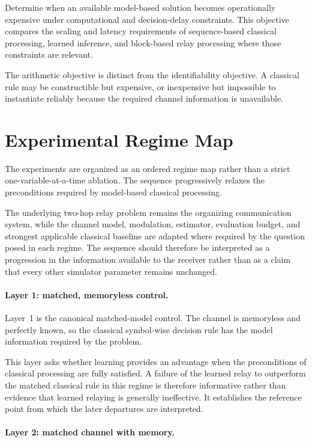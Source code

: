 Determine when an available model-based solution becomes operationally
expensive under computational and decision-delay constraints. This objective
compares the scaling and latency requirements of sequence-based classical
processing, learned inference, and block-based relay processing where those
constraints are relevant.

The arithmetic objective is distinct from the identifiability objective. A
classical rule may be constructible but expensive, or inexpensive but
impossible to instantiate reliably because the required channel information
is unavailable.


\section{Experimental Regime Map}
\label{sec:experimental-regime-map}

The experiments are organized as an ordered regime map rather than a strict
one-variable-at-a-time ablation. The sequence progressively relaxes the
preconditions required by model-based classical processing.

The underlying two-hop relay problem remains the organizing communication
system, while the channel model, modulation, estimator, evaluation budget, and
strongest applicable classical baseline are adapted where required by the
question posed in each regime. The sequence should therefore be interpreted
as a progression in the information available to the receiver rather than as
a claim that every other simulator parameter remains unchanged.


\paragraph{Layer 1: matched, memoryless control.}

Layer~1 is the canonical matched-model control. The channel is memoryless and
perfectly known, so the classical symbol-wise decision rule has the model
information required by the problem.

This layer asks whether learning provides an advantage when the preconditions
of classical processing are fully satisfied. A failure of the learned relay
to outperform the matched classical rule in this regime is therefore
informative rather than evidence that learned relaying is generally
ineffective. It establishes the reference point from which the later
departures are interpreted.


\paragraph{Layer 2: matched channel with memory.}

